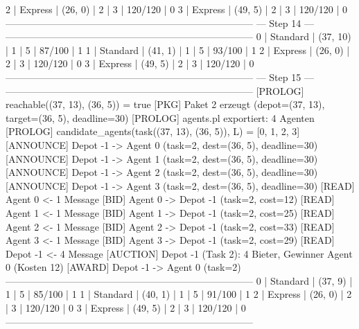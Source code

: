  2     | Express   | (26, 0)     | 2       | 3          | 120/120   | 0
 3     | Express   | (49, 5)     | 2       | 3          | 120/120   | 0
-----------------------------------------------------------------------------
                               --- Step 14 ---
-----------------------------------------------------------------------------
 0     | Standard  | (37, 10)    | 1       | 5          | 87/100    | 1
 1     | Standard  | (41, 1)     | 1       | 5          | 93/100    | 1
 2     | Express   | (26, 0)     | 2       | 3          | 120/120   | 0
 3     | Express   | (49, 5)     | 2       | 3          | 120/120   | 0
-----------------------------------------------------------------------------
                               --- Step 15 ---
-----------------------------------------------------------------------------
[PROLOG]   reachable((37, 13), (36, 5)) = true
[PKG]      Paket 2 erzeugt (depot=(37, 13), target=(36, 5), deadline=30)
[PROLOG]   agents.pl exportiert: 4 Agenten
[PROLOG]   candidate_agents(task((37, 13), (36, 5)), L) = [0, 1, 2, 3]
[ANNOUNCE] Depot -1 -> Agent 0 (task=2, dest=(36, 5), deadline=30)
[ANNOUNCE] Depot -1 -> Agent 1 (task=2, dest=(36, 5), deadline=30)
[ANNOUNCE] Depot -1 -> Agent 2 (task=2, dest=(36, 5), deadline=30)
[ANNOUNCE] Depot -1 -> Agent 3 (task=2, dest=(36, 5), deadline=30)
[READ]    Agent 0 <- 1 Message
[BID]      Agent 0 -> Depot -1 (task=2, cost=12)
[READ]    Agent 1 <- 1 Message
[BID]      Agent 1 -> Depot -1 (task=2, cost=25)
[READ]    Agent 2 <- 1 Message
[BID]      Agent 2 -> Depot -1 (task=2, cost=33)
[READ]    Agent 3 <- 1 Message
[BID]      Agent 3 -> Depot -1 (task=2, cost=29)
[READ]    Depot -1 <- 4 Message
[AUCTION] Depot -1 (Task 2): 4 Bieter, Gewinner Agent 0 (Kosten 12)
[AWARD]    Depot -1 -> Agent 0 (task=2)
-----------------------------------------------------------------------------
 0     | Standard  | (37, 9)     | 1       | 5          | 85/100    | 1
 1     | Standard  | (40, 1)     | 1       | 5          | 91/100    | 1
 2     | Express   | (26, 0)     | 2       | 3          | 120/120   | 0
 3     | Express   | (49, 5)     | 2       | 3          | 120/120   | 0
-----------------------------------------------------------------------------